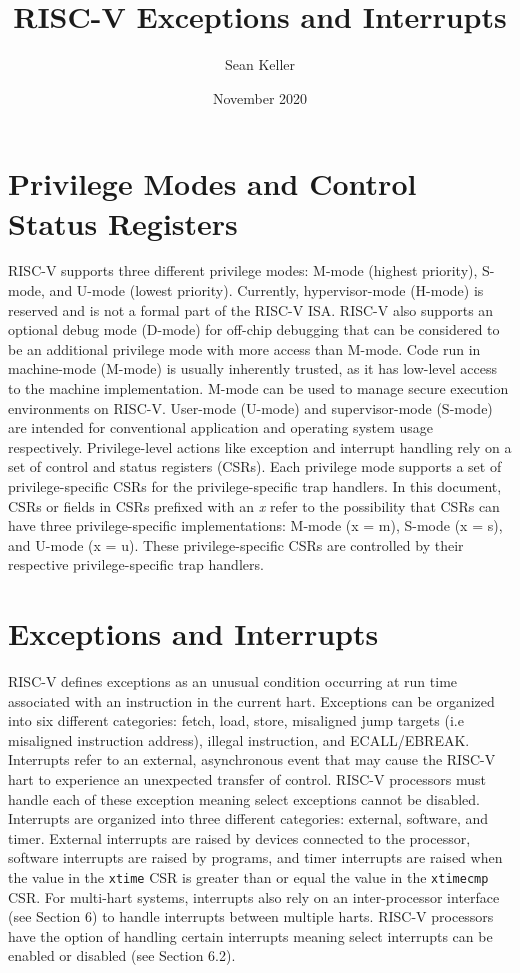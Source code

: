 \documentclass[12pt]{article}
\title{RISC-V Exceptions and Interrupts}
\author{Sean Keller}
\date{November 2020}
\begin{document}
\maketitle
\newpage

\section{Privilege Modes and Control Status Registers}
RISC-V supports three different privilege modes: M-mode (highest priority), S-mode, and U-mode (lowest priority). Currently, hypervisor-mode (H-mode) is reserved and is not a formal part of the RISC-V ISA. RISC-V also supports an optional debug mode (D-mode) for off-chip debugging that can be considered to be an additional privilege mode with more access than M-mode. Code run in machine-mode (M-mode) is usually inherently trusted, as it has low-level access to the machine implementation. M-mode can be used to manage secure execution environments on RISC-V. User-mode (U-mode) and supervisor-mode (S-mode) are intended for conventional application and operating system usage respectively. Privilege-level actions like exception and interrupt handling rely on a set of control and status registers (CSRs). Each privilege mode supports a set of privilege-specific CSRs for the privilege-specific trap handlers. In this document, CSRs or fields in CSRs prefixed with an \emph{x} refer to the possibility that CSRs can have three privilege-specific implementations: M-mode (x = m), S-mode (x = s), and U-mode (x = u). These privilege-specific CSRs are controlled by their respective privilege-specific trap handlers.

\section{Exceptions and Interrupts}
RISC-V defines exceptions as an unusual condition occurring at run time associated with an instruction in the current hart. Exceptions can be organized into six different categories: fetch, load, store, misaligned jump targets (i.e misaligned instruction address), illegal instruction, and ECALL/EBREAK. Interrupts refer to an external, asynchronous event that may cause the RISC-V hart to experience an unexpected transfer of control. RISC-V processors must handle each of these exception meaning select exceptions cannot be disabled. Interrupts are organized into three different categories: external, software, and timer. External interrupts are raised by devices connected to the processor, software interrupts are raised by programs, and timer interrupts are raised when the value in the {\tt{xtime}} CSR is greater than or equal the value in the {\tt{xtimecmp}} CSR. For multi-hart systems, interrupts also rely on an inter-processor interface (see Section 6) to handle interrupts between multiple harts. RISC-V processors have the option of handling certain interrupts meaning select interrupts can be enabled or disabled (see Section 6.2). 
\end{document}
